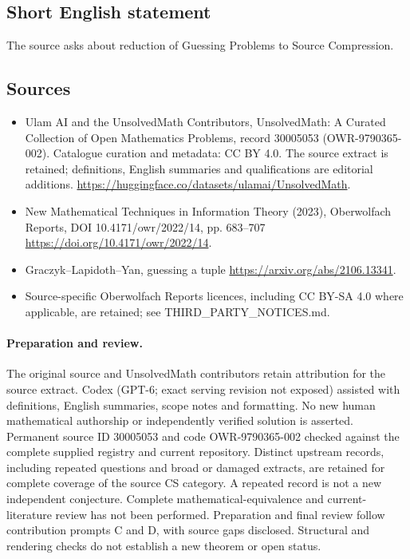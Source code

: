 \documentclass[11pt]{article}
\begin{document}
\subsection{Short English statement}
The source asks about reduction of Guessing Problems to Source Compression.
\subsection{Sources}
\begin{itemize}
\item[\hypertarget{source:30005053:1}{S1}] Ulam AI and the UnsolvedMath Contributors, UnsolvedMath: A Curated Collection of Open Mathematics Problems, record 30005053 (OWR-9790365-002). Catalogue curation and metadata: CC BY 4.0. The source extract is retained; definitions, English summaries and qualifications are editorial additions.
\url{https://huggingface.co/datasets/ulamai/UnsolvedMath}.
\item[\hypertarget{source:30005053:2}{S2}] New Mathematical Techniques in Information Theory (2023), Oberwolfach Reports, DOI 10.4171/owr/2022/14, pp. 683--707
\url{https://doi.org/10.4171/owr/2022/14}.
\item[\hypertarget{source:30005053:3}{S3}] Graczyk--Lapidoth--Yan, guessing a tuple
\url{https://arxiv.org/abs/2106.13341}.
\item Source-specific Oberwolfach Reports licences, including CC BY-SA 4.0 where applicable, are retained; see THIRD\_PARTY\_NOTICES.md.
\end{itemize}
\paragraph{Preparation and review.}
The original source and UnsolvedMath contributors retain attribution for the source extract. Codex (GPT-6; exact serving revision not exposed) assisted with definitions, English summaries, scope notes and formatting. No new human mathematical authorship or independently verified solution is asserted. Permanent source ID 30005053 and code OWR-9790365-002 checked against the complete supplied registry and current repository. Distinct upstream records, including repeated questions and broad or damaged extracts, are retained for complete coverage of the source CS category. A repeated record is not a new independent conjecture. Complete mathematical-equivalence and current-literature review has not been performed. Preparation and final review follow contribution prompts C and D, with source gaps disclosed. Structural and rendering checks do not establish a new theorem or open status.
\label{end:30005053}
\end{document}
